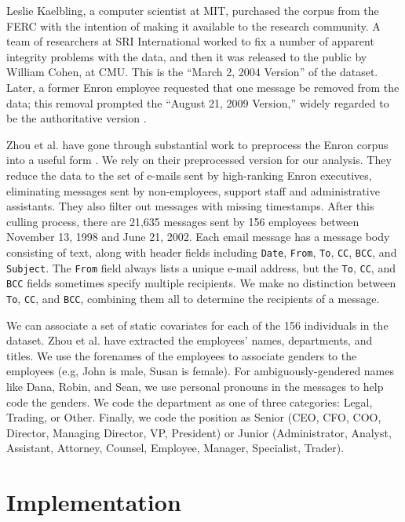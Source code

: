 \documentclass[aoas,preprint]{imsart}
\begin{document}
Leslie Kaelbling, a computer scientist at MIT, purchased the corpus from the
FERC with the intention of making it available to the research community. A
team of researchers at SRI International worked to fix a number of apparent
integrity problems with the data, and then it was released to the public by
William Cohen, at CMU. This is the ``March 2, 2004 Version'' of the dataset.
Later, a former Enron employee requested that one message be removed from the
data; this removal prompted the ``August 21, 2009 Version,'' widely regarded
to be the authoritative version \cite{cohen2009enron}.

Zhou et al. have gone through substantial work to preprocess the Enron corpus
into a useful form \cite{zhou2007strategies}. We rely on their preprocessed
version for our analysis. They reduce the data to the set of e-mails sent by
high-ranking Enron executives, eliminating messages sent by non-employees,
support staff and administrative assistants. They also filter out messages
with missing timestamps. After this culling process, there are 21,635 messages
sent by 156 employees between November 13, 1998 and June 21, 2002. Each email
message has a message body consisting of text, along with header fields
including \texttt{Date}, \texttt{From}, \texttt{To}, \texttt{CC},
\texttt{BCC}, and \texttt{Subject}. The \texttt{From} field always lists a
unique e-mail address, but the \texttt{To}, \texttt{CC}, and \texttt{BCC}
fields sometimes specify multiple recipients. We make no distinction between
\texttt{To}, \texttt{CC}, and \texttt{BCC}, combining them all to determine
the recipients of a message.

We can associate a set of static covariates for each of the 156 individuals in
the dataset. Zhou et al. have extracted the employees' names, departments, and
titles. We use the forenames of the employees to associate genders to the
employees (e.g, John is male, Susan is female). For ambiguously-gendered names
like Dana, Robin, and Sean, we use personal pronouns in the messages to help
code the genders. We code the department as one of three categories: Legal,
Trading, or Other. Finally, we code the position as Senior (CEO, CFO, COO,
Director, Managing Director, VP, President) or Junior (Administrator, Analyst,
Assistant, Attorney, Counsel, Employee, Manager, Specialist, Trader).



\section{Implementation}\label{S:implementaiton}
\end{document}
